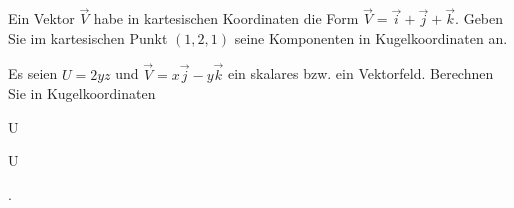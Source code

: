 \begin{atiTask}[
  title = Differentialoperatoren in Kugelkoordinaten
]

\begin{atiSubtasks}
\item Ein Vektor $\vec{V}$ habe in kartesischen Koordinaten die Form
$\vec{V}=\vec{i}+\vec{j}+\vec{k}$. 
Geben Sie im kartesischen Punkt $(1,2,1)$ seine Komponenten in Kugelkoordinaten an.

\item Es seien $U=2yz$ und $\vec{V}=x\vec{j}-y\vec{k}$ ein skalares bzw. ein Vektorfeld. Berechnen Sie in Kugelkoordinaten 
\begin{multicols}{4}
\begin{atiSubequations}
	\item{U}
	\item{}
	\item{\gradient U}
	\item{\curl {}.}

\end{atiSubequations}

\end{multicols}
\end{atiSubtasks} 


\end{atiTask}

\begin{atiSolution}
	
\end{atiSolution}